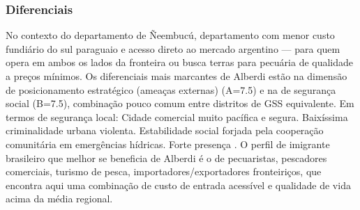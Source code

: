 \subsubsection*{Diferenciais}\label{dif-alberdi-1202}
No contexto do departamento de Ñeembucú, departamento com menor custo fundiário do sul paraguaio e acesso direto ao mercado argentino — para quem opera em ambos os lados da fronteira ou busca terras para pecuária de qualidade a preços mínimos. Os diferenciais mais marcantes de Alberdi estão na dimensão de posicionamento estratégico (ameaças externas) (A=7.5) e na de segurança social (B=7.5), combinação pouco comum entre distritos de GSS equivalente. Em termos de segurança local: Cidade comercial muito pacífica e segura. Baixíssima criminalidade urbana violenta. Estabilidade social forjada pela cooperação comunitária em emergências hídricas. Forte presença . O perfil de imigrante brasileiro que melhor se beneficia de Alberdi é o de pecuaristas, pescadores comerciais, turismo de pesca, importadores/exportadores fronteiriços, que encontra aqui uma combinação de custo de entrada acessível e qualidade de vida acima da média regional.
